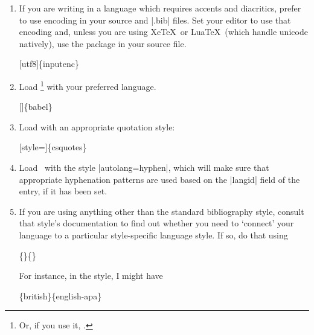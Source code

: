\begin{enumerate}
\item If you are writing in a language which requires accents and
  diacritics, prefer to use  encoding in your source
  and |.bib| files. Set your editor to use that encoding and, unless
  you are using Xe\TeX\ or Lua\TeX\ (which handle unicode natively),
  use the  package in your source file.
 \begin{pseudoverb}
 [utf8]\{inputenc\}
 \end{pseudoverb}
\item Load \footnote{Or, if you use it,
    .} with your preferred
  language.
 \begin{pseudoverb}
   []\{babel\}
 \end{pseudoverb}
\item Load  with an appropriate quotation style:
 \begin{pseudoverb}
   [style=]\{csquotes\}
 \end{pseudoverb}
\item Load \biblatex\ with the style |autolang=hyphen|, which will
  make sure that appropriate hyphenation patterns are used based on
  the |langid| field of the entry, if it has been set.
\item If you are using anything other than the standard bibliography
  style, consult that style's documentation to find out whether you
  need to `connect' your language to a particular style-specific
  language style. If so, do that using
 \begin{pseudoverb}
   \{\}\{\}
 \end{pseudoverb}
 For instance, in the  style, I might have
 \begin{pseudoverb}
   \{british\}\{english-apa\}
 \end{pseudoverb}
\end{enumerate}


